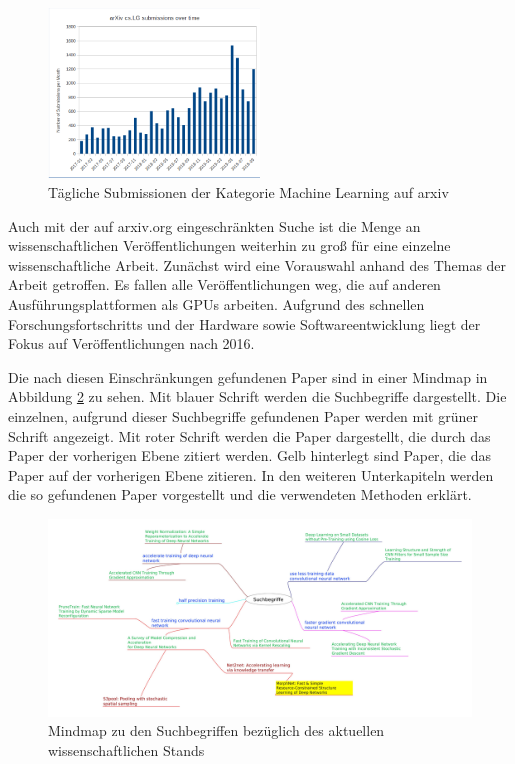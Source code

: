 \begin{figure}[h]
 \centering
 \includegraphics[width=0.5\textwidth]{KapitelPartA/images/arxiv.png}
 \caption{Tägliche Submissionen der Kategorie Machine Learning auf arxiv \cite{cornell}}
 \label{abb:arxiv}
\end{figure}


Auch mit der auf arxiv.org eingeschränkten Suche ist die Menge an wissenschaftlichen Veröffentlichungen weiterhin zu groß für eine einzelne wissenschaftliche Arbeit. Zunächst wird eine Vorauswahl anhand des Themas der Arbeit getroffen. Es fallen alle Veröffentlichungen weg, die auf anderen Ausführungsplattformen als GPUs arbeiten. Aufgrund des schnellen Forschungsfortschritts und der Hardware sowie Softwareentwicklung liegt der Fokus auf Veröffentlichungen nach 2016.

Die nach diesen Einschränkungen gefundenen Paper sind in einer Mindmap in Abbildung \ref{abb:mindmap} zu sehen. Mit blauer Schrift werden die Suchbegriffe dargestellt. Die einzelnen, aufgrund dieser Suchbegriffe gefundenen Paper werden mit grüner Schrift angezeigt. Mit roter Schrift werden die Paper dargestellt, die durch das Paper der vorherigen Ebene zitiert werden. Gelb hinterlegt sind Paper, die das Paper auf der vorherigen Ebene zitieren. In den weiteren Unterkapiteln werden die so gefundenen Paper vorgestellt und die verwendeten Methoden erklärt. 

\begin{figure}[h]
 \centering
 \includegraphics[width=1\textwidth]{KapitelPartA/images/mindmap.jpg}
 \caption{Mindmap zu den Suchbegriffen bezüglich des aktuellen wissenschaftlichen Stands}
 \label{abb:mindmap}
\end{figure}


